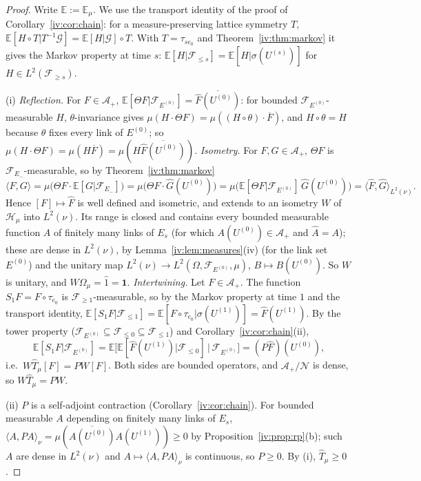 \documentclass[11pt,a4paper]{article}
\theoremstyle{definition}
\theoremstyle{remark}
\newcommand{\E}{\mathbb{E}}
\newcommand{\cH}{\mathcal{H}}
\newcommand{\cA}{\mathcal{A}}
\newcommand{\cF}{\mathcal{F}}
\newcommand{\cN}{\mathcal{N}}
\newcommand{\hT}{\hat{T}}
\newcommand{\ip}[2]{\langle #1,#2\rangle}
\begin{document}
\begin{proof}
Write $\E:=\E_\mu$. We use the transport identity of the proof of Corollary~\ref{iv:cor:chain}: for a measure-preserving lattice
symmetry $T$, $\E[H\circ T|T^{-1}\mathcal G]=\E[H|\mathcal G]\circ T$. With $T=\tau_{se_0}$ and Theorem~\ref{iv:thm:markov} it gives the
Markov property at time $s$: $\E[H|\cF_{\le s}]=\E[H|\sigma(U^{(s)})]$ for $H\in L^2(\cF_{\ge s})$.

(i) \emph{Reflection.} For $F\in\cA_+$, $\E[\Theta F|\cF_{E^{(0)}}]=\overline{\hat F(U^{(0)})}$: for bounded $\cF_{E^{(0)}}$-measurable $H$,
$\theta$-invariance gives $\mu(H\cdot\Theta F)=\mu((H\circ\theta)\cdot\overline F)$, and $H\circ\theta=H$ because $\theta$ fixes every
link of $E^{(0)}$; so $\mu(H\cdot\Theta F)=\mu(H\overline F)=\mu(H\overline{\hat F(U^{(0)})})$.
\emph{Isometry.} For $F,G\in\cA_+$, $\Theta F$ is $\cF_{E_-}$-measurable, so by Theorem~\ref{iv:thm:markov}
\[
\ip FG=\mu\bigl(\Theta F\cdot\E[G|\cF_{E_-}]\bigr)=\mu\bigl(\Theta F\cdot\hat G(U^{(0)})\bigr)=\mu\bigl(\E[\Theta F|\cF_{E^{(0)}}]\,\hat G(U^{(0)})\bigr)
=\ip{\hat F}{\hat G}_{L^2(\nu)} .
\]
Hence $[F]\mapsto\hat F$ is well defined and isometric, and extends to an isometry $W$ of $\cH_\mu$ into $L^2(\nu)$. Its range is
closed and contains every bounded measurable function $A$ of finitely many links of $E_s$ (for which $A(U^{(0)})\in\cA_+$ and
$\hat A=A$); these are dense in $L^2(\nu)$, by Lemma~\ref{iv:lem:measures}(iv) (for the link set $E^{(0)}$) and the unitary map
$L^2(\nu)\to L^2(\Omega,\cF_{E^{(0)}},\mu)$, $B\mapsto B(U^{(0)})$. So $W$ is unitary, and
$W\Omega_\mu=\hat1=\mathbf 1$.
\emph{Intertwining.} Let $F\in\cA_+$. The function $S_1F=F\circ\tau_{e_0}$ is $\cF_{\ge1}$-measurable, so by the Markov property at
time $1$ and the transport identity, $\E[S_1F|\cF_{\le1}]=\E[F\circ\tau_{e_0}|\sigma(U^{(1)})]=\hat F(U^{(1)})$. By the tower property
($\cF_{E^{(0)}}\subseteq\cF_{\le0}\subseteq\cF_{\le1}$) and Corollary~\ref{iv:cor:chain}(ii),
\[
\E[S_1F|\cF_{E^{(0)}}]=\E\bigl[\E[\hat F(U^{(1)})|\cF_{\le0}]\,\big|\,\cF_{E^{(0)}}\bigr]=(P\hat F)(U^{(0)}),
\]
i.e.\ $W\hT_\mu[F]=PW[F]$. Both sides are bounded operators, and $\cA_+/\cN$ is dense, so $W\hT_\mu=PW$.

(ii) $P$ is a self-adjoint contraction (Corollary~\ref{iv:cor:chain}). For bounded measurable $A$ depending on finitely many links of
$E_s$, $\ip A{PA}_\nu=\mu(\overline{A(U^{(0)})}A(U^{(1)}))\ge0$ by Proposition~\ref{iv:prop:rp}(b); such $A$ are dense in $L^2(\nu)$ and
$A\mapsto\ip A{PA}_\nu$ is continuous, so $P\ge0$. By (i), $\hT_\mu\ge0$.


\end{proof}
\end{document}

